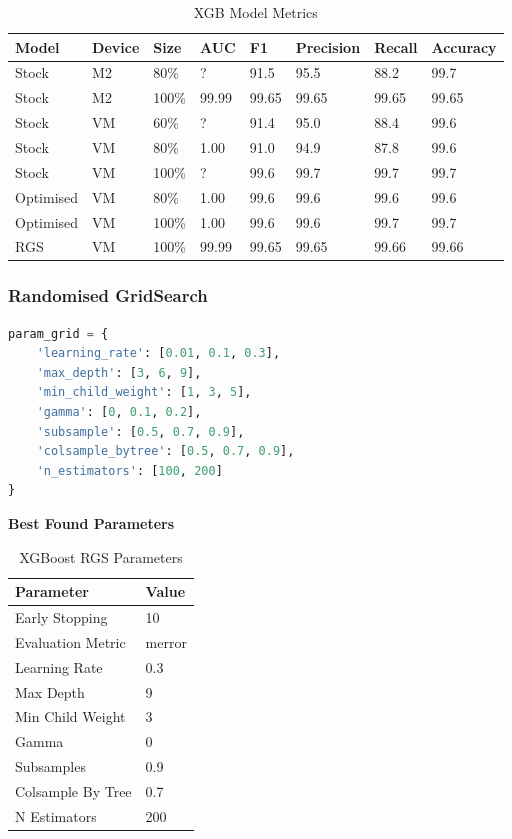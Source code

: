 \begin{table}[h]
\centering
\caption{XGB Model Metrics}
\label{tab:xgb-metrics}
\begin{tabular}{|l|l|l|l|l|l|l|l|}
\hline
\textbf{Model} & \textbf{Device} & \textbf{Size} & \textbf{AUC} & \textbf{F1} & \textbf{Precision} & \textbf{Recall} & \textbf{Accuracy} \\ \hline
Stock & M2 & 80\% & ? & 91.5 & 95.5 & 88.2 & 99.7 \\ \hline
Stock & M2 & 100\% & 99.99 & 99.65 & 99.65 & 99.65 & 99.65 \\ \hline
Stock & VM & 60\% & ? & 91.4 & 95.0 & 88.4 & 99.6 \\ \hline
Stock & VM & 80\% & 1.00 & 91.0 & 94.9 & 87.8 & 99.6 \\ \hline
Stock & VM & 100\% & ? & 99.6 & 99.7 & 99.7 & 99.7 \\ \hline
Optimised & VM & 80\% & 1.00 & 99.6 & 99.6 & 99.6 & 99.6 \\ \hline
Optimised & VM & 100\% & 1.00 & 99.6 & 99.6 & 99.7 & 99.7 \\ \hline
RGS & VM & 100\% & 99.99 & 99.65 & 99.65 & 99.66 & 99.66 \\ \hline
\end{tabular}
\end{table}



\subsubsection*{Randomised GridSearch}

\begin{lstlisting}[language=Python, caption={Grid Search Parameters For XGBoost}]
param_grid = {
    'learning_rate': [0.01, 0.1, 0.3],
    'max_depth': [3, 6, 9],
    'min_child_weight': [1, 3, 5],
    'gamma': [0, 0.1, 0.2],
    'subsample': [0.5, 0.7, 0.9],
    'colsample_bytree': [0.5, 0.7, 0.9],
    'n_estimators': [100, 200]
}
\end{lstlisting}

\textbf{Best Found Parameters}
\medskip

\begin{table}[h]
\captionsetup{justification=centering} 
\centering
\caption{XGBoost RGS Parameters}
\begin{tabular}{ll}
\hline
\textbf{Parameter} & \textbf{Value} \\ \hline
Early Stopping & 10 \\
Evaluation Metric & merror \\
Learning Rate & 0.3 \\
Max Depth & 9 \\
Min Child Weight & 3 \\
Gamma & 0 \\
Subsamples & 0.9 \\
Colsample By Tree & 0.7 \\
N Estimators & 200 \\ \hline
\end{tabular}
\label{tab:xg_rgs_parameters}
\end{table}

